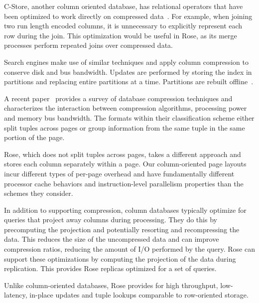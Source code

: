 \documentclass{vldb}
\newcommand{\rows}{Rose\xspace}
\begin{document}
C-Store, another column oriented database, has relational operators
that have been optimized to work directly on compressed
data~\cite{compExec}.  For example, when joining two run length encoded
columns, it is unnecessary to explicitly represent each row during the
join.  This optimization would be useful in \rows, as its
merge processes perform repeated joins over compressed data.

Search engines make use of similar techniques and apply column compression to conserve
disk and bus bandwidth.  Updates are performed by storing the index in
partitions and replacing entire partitions at a
time.  Partitions are rebuilt offline~\cite{searchengine}.

A recent paper~\cite{bitsForChronos} provides a survey of database compression techniques
and characterizes the interaction between compression algorithms,
processing power and memory bus bandwidth.  The formats within their
classification scheme either split tuples across pages or group
information from the same tuple in the same portion of the
page.

\rows, which does not split tuples across pages, takes a different
approach and stores each column separately within a page.  Our
column-oriented page layouts incur different types of per-page overhead and
have fundamentally different processor
cache behaviors and instruction-level parallelism properties than the
schemes they consider.

In addition to supporting compression, column databases typically
optimize for queries that project away columns during processing.
They do this by precomputing the projection and potentially resorting
and recompressing the data.  This reduces the size of the uncompressed
data and can improve compression ratios, reducing the amount of I/O
performed by the query.  \rows can support these optimizations by
computing the projection of the data during replication.  This
provides \rows replicas optimized for a set of queries.

Unlike column-oriented databases, \rows provides
for high throughput, low-latency, in-place updates and tuple lookups comparable to row-oriented storage.

\end{document}
